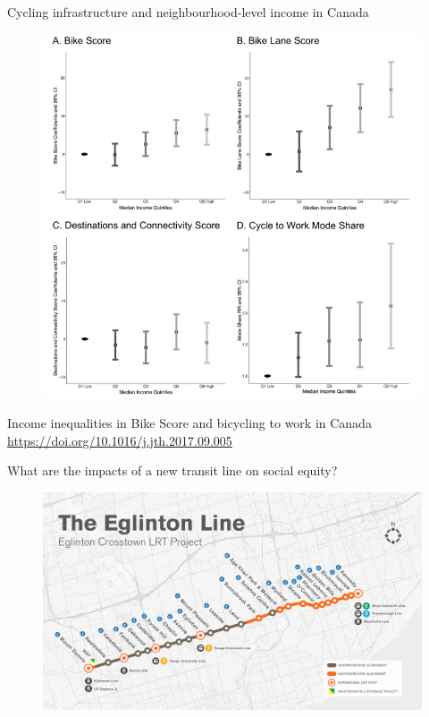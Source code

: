 \documentclass[aspectratio=169]{beamer}
\begin{document}
\begin{frame}
	
	Cycling infrastructure and neighbourhood-level income in Canada
	
	\begin{figure}
		\centering
		\includegraphics[width=0.6\linewidth]{images/bikescore_income.png}
	\end{figure}
	
	\tiny Income inequalities in Bike Score and bicycling to work in Canada \url{https://doi.org/10.1016/j.jth.2017.09.005}
	
\end{frame}





\begin{frame}
	
	What are the impacts of a new transit line on social equity?
	
	
	\begin{figure}
		\centering
		\includegraphics[width=0.74\linewidth]{images/crosstown.png}
	\end{figure}
	
	
\end{frame}
\end{document}
